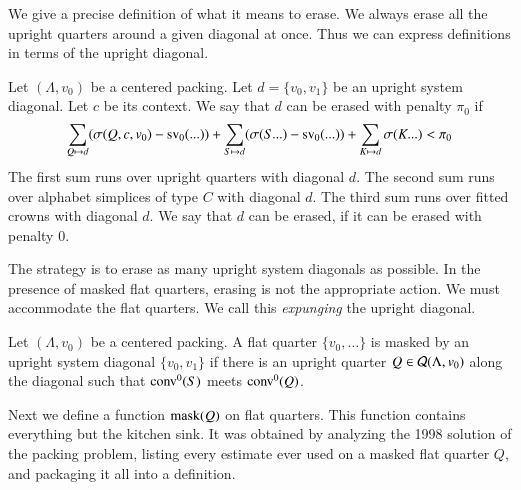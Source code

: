 We give a precise definition of what it means to erase.  We always
erase all the upright quarters around a given diagonal at once.  Thus
we can express definitions in terms of the upright diagonal.


\begin{definition}[erase]  Let $(\Lambda,v_0)$ be a centered packing.
Let $d=\{v_0,v_1\}$ be
an upright system diagonal.  Let $c$ be its context.  We say that $d$
can be erased with penalty $\pi_0$ if
$$
\sum_{Q\mapsto d}(\sigma(Q,c,v_0) - {\operatorname{sv}}_0(...)) + 
\sum_{S\mapsto d}(\sigma(S...) - {\operatorname{sv}}_0(...)) +
\sum_{K\mapsto d}\sigma(K...)
< \pi_0
$$
The first sum runs over upright quarters with diagonal $d$.  The
second sum runs over alphabet simplices of type $C$ with diagonal $d$.
The third sum runs over fitted crowns with diagonal $d$.
We say that $d$ can be erased, if it can be erased with penalty $0$.
\end{definition}

The strategy is to erase as many upright system diagonals as possible.
In the presence of masked flat quarters,  erasing is not the appropriate
action.  We must 
accommodate the flat quarters.  We call this {\it expunging} the upright diagonal.  


\begin{definition}[mask]
Let $(\Lambda,v_0)$ be a centered packing.
A flat quarter $\{v_0,\ldots\}$ is masked by an upright system diagonal $\{v_0,v_1\}$ if there is an upright quarter $Q\in{\mathcal Q}(\Lambda,v_0)$ 
along the diagonal such that
${\operatorname{conv}}^0(S)$ meets ${\operatorname{conv}}^0(Q)$.
\end{definition}


Next we define a function ${\operatorname{mask}}(Q)$ on flat quarters.
This function contains everything
but the kitchen sink.  It was obtained by analyzing the 
1998 solution of the packing problem, listing
every estimate ever used
on a masked flat quarter $Q$, and packaging it all into a definition.

